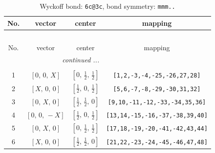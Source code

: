 \documentclass[fleqn,8pt]{jsarticle}
\begin{document}
\begin{longtable}{cccc}
\caption{Wyckoff bond: {\tt 6c@3c}, bond symmetry: {\tt mmm..}}
 \\
 \hline \hline
No. & vector & center & mapping \\ \hline \endfirsthead

\multicolumn{3}{l}{\tablename\ \thetable{}} \\
 \hline \hline
No. & vector & center & mapping \\ \hline \endhead

 \hline \hline
\multicolumn{3}{r}{\footnotesize\it continued ...} \\ \endfoot

 \hline \hline
\multicolumn{3}{r}{} \\ \endlastfoot

1 & $\left[ 0,\, 0,\, X \right]$ & $\left[ 0,\, \frac{1}{2},\, \frac{1}{2} \right]$ & {\tt [1,2,-3,-4,-25,-26,27,28]} \\ \hline
2 & $\left[ X,\, 0,\, 0 \right]$ & $\left[ \frac{1}{2},\, 0,\, \frac{1}{2} \right]$ & {\tt [5,6,-7,-8,-29,-30,31,32]} \\ \hline
3 & $\left[ 0,\, X,\, 0 \right]$ & $\left[ \frac{1}{2},\, \frac{1}{2},\, 0 \right]$ & {\tt [9,10,-11,-12,-33,-34,35,36]} \\ \hline
4 & $\left[ 0,\, 0,\, - X \right]$ & $\left[ \frac{1}{2},\, 0,\, \frac{1}{2} \right]$ & {\tt [13,14,-15,-16,-37,-38,39,40]} \\ \hline
5 & $\left[ 0,\, X,\, 0 \right]$ & $\left[ 0,\, \frac{1}{2},\, \frac{1}{2} \right]$ & {\tt [17,18,-19,-20,-41,-42,43,44]} \\ \hline
6 & $\left[ X,\, 0,\, 0 \right]$ & $\left[ \frac{1}{2},\, \frac{1}{2},\, 0 \right]$ & {\tt [21,22,-23,-24,-45,-46,47,48]} \\
\end{longtable}
\renewcommand{\arraystretch}{1.2}
\end{document}
